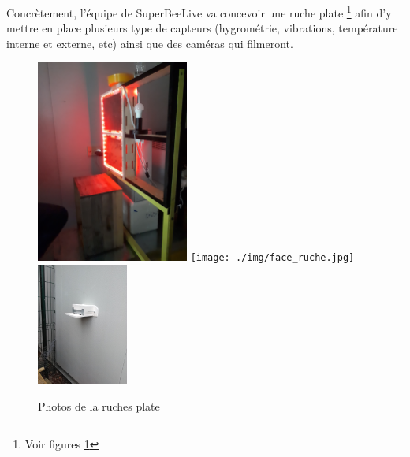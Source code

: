 \documentclass[11pt,french,a4paper]{report}
\begin{document}
Concrètement, l'équipe de SuperBeeLive va concevoir une ruche plate \footnote{Voir figures \ref{images_ruche_plate}} afin d'y mettre 
en place plusieurs type  de capteurs (hygrométrie, vibrations, température interne et externe, etc) ainsi que des caméras qui filmeront.
\begin{figure}[!h]
    \centering 
    \includegraphics[width=5cm,angle=270]{./img/cote_ruche.jpg} 
    \texttt{[image: ./img/face\_ruche.jpg]} \\
    \includegraphics[width=3cm]{./img/photo_exterieur_ruche.jpg}
    \caption{Photos de la ruches plate}
    \label{images_ruche_plate}
\end{figure}
\end{document}
